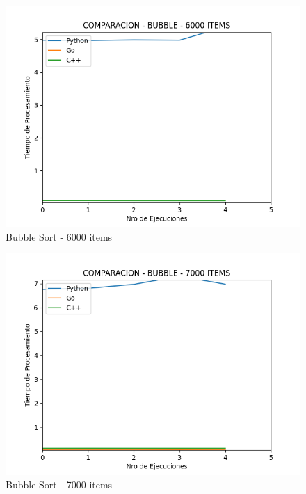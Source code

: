 \documentclass[12pt]{article} %
\begin{document}
    \begin{figure}[H]
    \centering
    \includegraphics[width=\textwidth]{bubble_6000}
    \caption{Bubble Sort - 6000 items}
    \end{figure}

    \vspace{5mm}
    
    \begin{figure}[H]
    \centering
    \includegraphics[width=\textwidth]{bubble_7000}
    \caption{Bubble Sort - 7000 items}
    \end{figure}

    \vspace{5mm}
    
\end{document}
